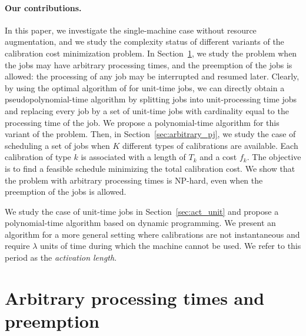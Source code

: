\paragraph{Our contributions.} In this paper, we investigate the single-machine case without resource augmentation, and we study the complexity status of different variants of the calibration cost minimization problem. In Section~\ref{sec:warm}, we study the problem when the jobs may have arbitrary processing times, and the preemption of the jobs is allowed: the processing of any job may be interrupted and resumed later.  Clearly, by using the optimal algorithm of \cite{bender2013efficient} for unit-time jobs, we can directly obtain a pseudopolynomial-time algorithm by splitting jobs into unit-processing time jobs and replacing every job by a set of unit-time jobs with cardinality equal to the processing time of the job. We propose a polynomial-time algorithm for this variant of the problem.  Then, in Section~\ref{sec:arbitrary_pj}, we study the case of scheduling a set of jobs when $K$ different types of calibrations are available. Each calibration of type $k$ is associated with a length of $T_k$ and a cost $f_k$. The objective is to find a feasible schedule minimizing the total calibration cost. We show that the problem with arbitrary processing times is NP-hard, even when the preemption of the jobs is allowed. 



We study the case of unit-time jobs in Section~\ref{sec:act_unit} and propose a polynomial-time algorithm based on dynamic programming. We present an algorithm for a more general setting where calibrations are not instantaneous and require $\lambda$ units of time during which the machine cannot be used. We refer to this period as the \emph{activation length}. 







\section{Arbitrary processing times and preemption}\label{sec:warm}


